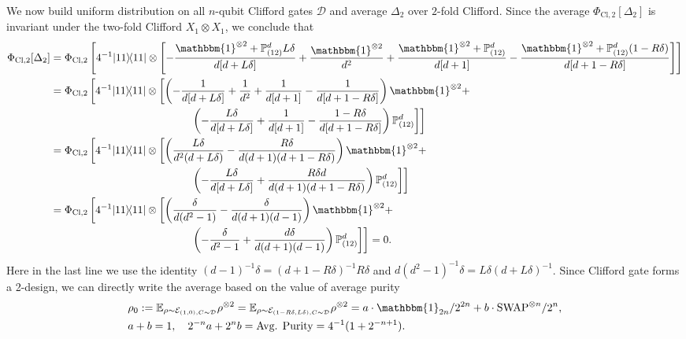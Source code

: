 \documentclass[aps,%
twocolumn,%
floatfix,%
pra,%
amsfonts,%
groupedaddress,%
superscriptaddress]{revtex4-2}%
\newcommand{\bra}[1]{\langle #1\rvert}
\newcommand{\ket}[1]{\lvert #1\rangle}
\newcommand{\1}{\mathbbm{1}}
\begin{document}
We now build uniform distribution on all $n$-qubit Clifford gates $\mathcal{D}$ and average $\Delta_{2}$ over $2$-fold Clifford. Since the average $\Phi_{\mathrm{Cl},2}[\Delta_2]$ is invariant under the two-fold Clifford $X_1 \otimes X_1$, we conclude that 
\begin{align}
    \Phi_{\mathrm{Cl},2}[\Delta_2] &= \Phi_{\mathrm{Cl},2}\left[4^{-1} {\ket{11}\!\bra{11}} 
     \otimes \left[-\frac{\1^{\otimes 2} + \mathbb{P}^{d}_{(12)}L\delta}{d[d + L\delta] } +  \frac{\1^{\otimes 2}}{ d^{2}} + \frac{\1^{\otimes 2}  + \mathbb{P}^{d}_{(12)}}{d[d + 1] } -\frac{\1^{\otimes 2} + \mathbb{P}^{d}_{(12)}(1 -R\delta)}{d[d+ 1 -R\delta] } \right]\right]\\
     &=\Phi_{\mathrm{Cl},2}\left[4^{-1} {\ket{11}\!\bra{11}} 
     \otimes \left[\left(-\frac{1}{d[d + L\delta] } +  \frac{1}{ d^{2}} + \frac{1}{d[d + 1] } -\frac{1}{d[d+ 1 -R\delta] } \right)\1^{\otimes 2} +\right.\right.\notag\\
    & \hspace{13em}\left.\left. \left(-\frac{L\delta}{d[d + L\delta] } + \frac{1}{d[d + 1] } -\frac{ 1-R\delta}{d[d+ 1 -R\delta] } \right)\mathbb{P}^{d}_{(12)}\right]\right]\\
    &=\Phi_{\mathrm{Cl},2}\left[4^{-1} {\ket{11}\!\bra{11}} 
     \otimes \left[\left(\frac{L\delta}{d^2(d + L \delta)} -\frac{R\delta}{d(d+1)(d+1 - R\delta)} \right)\1^{\otimes 2} +\right.\right.\notag\\
    & \hspace{13em}\left.\left. \left(-\frac{L\delta}{d[d + L\delta] } + \frac{R\delta d}{d(d+1)(d+1-R\delta)}\right)\mathbb{P}^{d}_{(12)}\right]\right]\\
    &=\Phi_{\mathrm{Cl},2}\left[4^{-1} {\ket{11}\!\bra{11}}
     \otimes \left[\left(\frac{\delta}{d(d^2 -1)} -\frac{\delta}{d(d+1)(d - 1)} \right)\1^{\otimes 2} +\right.\right.\notag\\
    & \hspace{13em}\left.\left. \left(-\frac{\delta}{d^2 - 1} + \frac{d\delta}{d(d+1)(d-1)}\right)\mathbb{P}^{d}_{(12)}\right]\right] = 0. \label{eq:t=1_Delta}
\end{align}
Here in the last line we use the identity $(d-1)^{-1}\delta = (d + 1 - R\delta)^{-1} R\delta$ and  $d(d^2 - 1)^{-1}\delta = L\delta (d+L\delta)^{-1}$.
Since Clifford gate forms a 2-design, we can directly write the average based on the value of average purity
\begin{align}
    &\rho_0 := \mathbb{E}_{\rho \sim \mathcal{E}_{(1,0),C\sim \mathcal{D}}} \rho^{\otimes 2}=\mathbb{E}_{\rho \sim \mathcal{E}_{(1 - R\delta,L\delta),C\sim \mathcal{D}}} \rho^{\otimes 2} = a\cdot \1_{2n}/2^{2n} + b\cdot \mathrm{SWAP}^{\otimes n}/2^{n}, \\
    & a + b = 1, \quad 2^{-n} a + 2^{n} b = \text{Avg. Purity} = 4^{-1}(1 + 2^{-n+1}).
\end{align}
\end{document}
